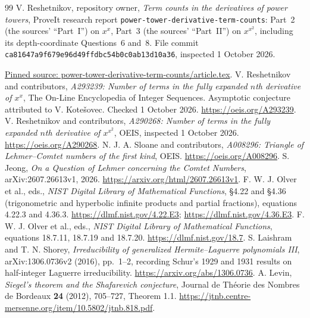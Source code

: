 \documentclass[11pt,a4paper]{article}
\numberwithin{equation}{section}
\theoremstyle{definition}
\theoremstyle{plain}
\begin{document}
\begin{thebibliography}{99}
V. Reshetnikov, repository owner, \emph{Term counts in the derivatives of power towers}, ProveIt research report \texttt{power-\allowbreak{}tower-\allowbreak{}derivative-\allowbreak{}term-\allowbreak{}counts}: Part~2 (the sources' ``Part~I'') on $x^x$, Part~3 (the sources' ``Part~II'') on $x^{x^2}$, including its depth-coordinate Questions~6 and~8. File commit \texttt{ca81647a9f679e96d49ffdbc54b0c0ab13d10a36}, inspected 1 October 2026.\par
\href{https://github.com/VladimirReshetnikov/ProveIt/blob/ca81647a9f679e96d49ffdbc54b0c0ab13d10a36/SetTheory/Cardinals/docs/reports/generating-functions-and-asymptotics/oeis-sequence-asymptotics/power-tower-derivative-term-counts/article.tex}{Pinned source: power-tower-derivative-term-counts/article.tex}.
V. Reshetnikov and contributors, \emph{A293239: Number of terms in the fully expanded $n$th derivative of $x^x$}, The On-Line Encyclopedia of Integer Sequences. Asymptotic conjecture attributed to V. Kote\v{s}ovec. Checked 1 October 2026. \url{https://oeis.org/A293239}.
V. Reshetnikov and contributors, \emph{A290268: Number of terms in the fully expanded $n$th derivative of $x^{x^2}$}, OEIS, inspected 1 October 2026. \url{https://oeis.org/A290268}.
N. J. A. Sloane and contributors, \emph{A008296: Triangle of Lehmer--Comtet numbers of the first kind}, OEIS. \url{https://oeis.org/A008296}.
S. Jeong, \emph{On a Question of Lehmer concerning the Comtet Numbers}, arXiv:2607.26613v1, 2026. \url{https://arxiv.org/html/2607.26613v1}.
F. W. J. Olver et al., eds., \emph{NIST Digital Library of Mathematical Functions}, \S4.22 and \S4.36 (trigonometric and hyperbolic infinite products and partial fractions), equations 4.22.3 and 4.36.3. \url{https://dlmf.nist.gov/4.22.E3}; \url{https://dlmf.nist.gov/4.36.E3}.
F. W. J. Olver et al., eds., \emph{NIST Digital Library of Mathematical Functions}, equations 18.7.11, 18.7.19 and 18.7.20. \url{https://dlmf.nist.gov/18.7}.
S. Laishram and T. N. Shorey, \emph{Irreducibility of generalized Hermite--Laguerre polynomials III}, arXiv:1306.0736v2 (2016), pp.~1--2, recording Schur's 1929 and 1931 results on half-integer Laguerre irreducibility. \url{https://arxiv.org/abs/1306.0736}.
A. Levin, \emph{Siegel's theorem and the Shafarevich conjecture}, Journal de Th\'eorie des Nombres de Bordeaux \textbf{24} (2012), 705--727, Theorem 1.1. \url{https://jtnb.centre-mersenne.org/item/10.5802/jtnb.818.pdf}.

\end{thebibliography}
\end{document}
